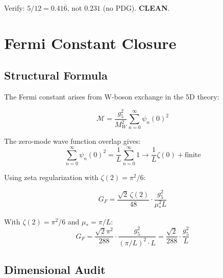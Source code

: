 \documentclass[11pt,a4paper]{article}
\begin{document}
\begin{trapbox}
\label{trap:rt06}
Verify: $5/12 = 0.41\overline{6}$, not $0.231$ (no PDG). \textbf{CLEAN}.
\end{trapbox}

\section{Fermi Constant Closure}
\label{sec:gf-closure}

\subsection{Structural Formula}
\label{subsec:gf-structure}

The Fermi constant arises from W-boson exchange in the 5D theory:

\begin{equation}
\label{eq:gf-5d-amplitude}
\mathcal{M} = \frac{g_5^2}{M_W^2} \sum_{n=0}^{\infty} \psi_n(0)^2
\end{equation}

The zero-mode wave function overlap gives:
\begin{equation}
\label{eq:overlap-sum}
\sum_{n=0}^{\infty} \psi_n(0)^2 = \frac{1}{L} \sum_{n=0}^{\infty} 1 \to \frac{1}{L}\zeta(0) + \text{finite}
\end{equation}

Using zeta regularization with $\zeta(2) = \pi^2/6$:

\begin{canonbox}
\label{box:gf-formula}
\begin{equation}
\label{eq:gf-formula}
G_F = \frac{\sqrt{2}\,\zeta(2)}{48} \cdot \frac{g_5^2}{\mu_*^2 L}
\end{equation}

With $\zeta(2) = \pi^2/6$ and $\mu_* = \pi/L$:
\begin{equation}
\label{eq:gf-explicit}
G_F = \frac{\sqrt{2}\pi^2}{288} \cdot \frac{g_5^2}{(\pi/L)^2 \cdot L} = \frac{\sqrt{2}}{288} \cdot \frac{g_5^2}{L}
\end{equation}
\end{canonbox}

\subsection{Dimensional Audit}
\label{subsec:gf-dim-audit}
\end{document}

